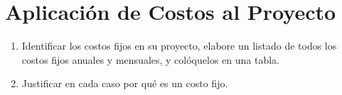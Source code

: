\documentclass[../main]{subfiles}
\begin{document}
\chapter{Aplicación de Costos al Proyecto}
\begin{enumerate}
  \item Identificar los costos fijos en su proyecto, elabore un
    listado de todos los costos fijos anuales y mensuales, y
    colóquelos en una tabla.
  \item Justificar en cada caso por qué es un costo fijo.
\end{enumerate}
\end{document}
